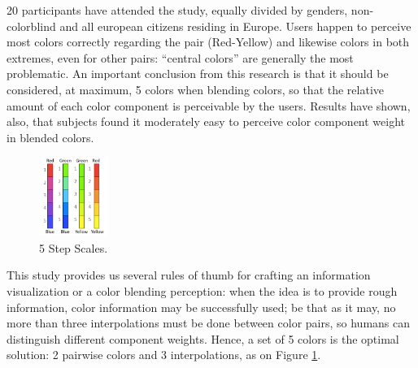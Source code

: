 20 participants have attended the study, equally divided by genders, non-colorblind and all european
citizens residing in Europe. Users happen to perceive most colors correctly regarding the pair (Red-Yellow)
and likewise colors in both extremes, even for other pairs: “central colors” are generally the most
problematic. An important conclusion from this research is that it should be considered, at maximum, 5
colors when blending colors, so that the relative amount of each color component is perceivable by the
users. Results have shown, also, that subjects found it moderately easy to perceive color component
weight in blended colors. \par
%
\begin{figure}
	\centering
    \vspace{-3\baselineskip}
    \includegraphics[width=0.2\textwidth]{images/background/TotalAmount2.png}
    \caption[Perception of Relative Amounts of Color - Smaller Ruler]{5 Step Scales.
    \protect\cite{Gama20142}}
    \label{fig:amount2}
\end{figure}
%
This study provides us several rules of thumb for crafting an information visualization or a color
blending perception: when the idea is to provide rough information, color information may be successfully
used; be that as it may, no more than three interpolations must be done between color pairs, so humans
can distinguish different component weights. Hence, a set of 5 colors is the optimal solution: 2
pairwise colors and 3 interpolations, as on Figure \ref{fig:amount2}. \par
%
